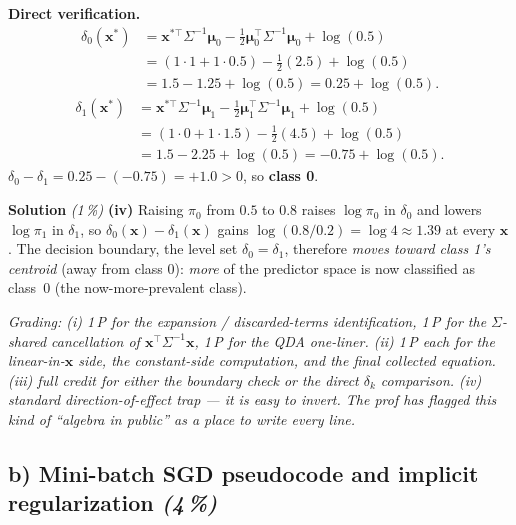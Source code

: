 \documentclass[11pt,a4paper]{article}
\newcommand{\subpoints}[1]{\textit{(#1\,\%)}}
\newcommand{\sol}{\noindent\textbf{Solution}}
\begin{document}
\textbf{Direct verification.}
\begin{align*}
\delta_0(\mathbf x^*) &= \mathbf x^{*\top}\Sigma^{-1}\boldsymbol\mu_0
                      - \tfrac{1}{2}\boldsymbol\mu_0^\top\Sigma^{-1}\boldsymbol\mu_0 + \log(0.5) \\
   &= (1\cdot 1 + 1\cdot 0.5) - \tfrac{1}{2}(2.5) + \log(0.5) \\
   &= 1.5 - 1.25 + \log(0.5) = 0.25 + \log(0.5).
\end{align*}
\begin{align*}
\delta_1(\mathbf x^*) &= \mathbf x^{*\top}\Sigma^{-1}\boldsymbol\mu_1
                      - \tfrac{1}{2}\boldsymbol\mu_1^\top\Sigma^{-1}\boldsymbol\mu_1 + \log(0.5) \\
   &= (1\cdot 0 + 1\cdot 1.5) - \tfrac{1}{2}(4.5) + \log(0.5) \\
   &= 1.5 - 2.25 + \log(0.5) = -0.75 + \log(0.5).
\end{align*}
$\delta_0 - \delta_1 = 0.25 - (-0.75) = +1.0 > 0$, so \textbf{class 0}. \checkmark

\medskip
\sol{} \subpoints{1} \textbf{(iv)} Raising $\pi_0$ from $0.5$ to $0.8$ raises $\log\pi_0$ in
$\delta_0$ and lowers $\log\pi_1$ in $\delta_1$, so $\delta_0(\mathbf x) - \delta_1(\mathbf x)$ gains
$\log(0.8/0.2) = \log 4 \approx 1.39$ at every $\mathbf x$. The decision boundary, the level set
$\delta_0 = \delta_1$, therefore \emph{moves toward class 1's centroid} (away from class 0):
\emph{more} of the predictor space is now classified as class~0 (the now-more-prevalent class).

\noindent\emph{Grading: (i) 1\,P for the expansion / discarded-terms identification, 1\,P for the
$\Sigma$-shared cancellation of $\mathbf x^\top\Sigma^{-1}\mathbf x$, 1\,P for the QDA one-liner.
(ii) 1\,P each for the linear-in-$\mathbf x$ side, the constant-side computation, and the final
collected equation. (iii) full credit for either the boundary check or the direct $\delta_k$
comparison. (iv) standard direction-of-effect trap --- it is easy to invert. The prof has flagged
this kind of ``algebra in public'' as a place to write every line.}

\subsection*{b) Mini-batch SGD pseudocode and implicit regularization \subpoints{4}}
\end{document}
